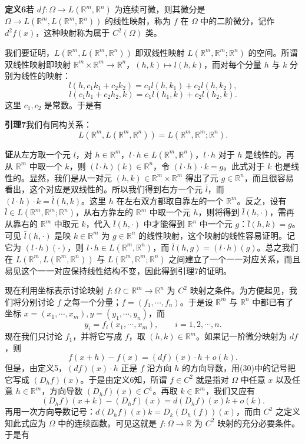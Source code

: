 \noindent\textbf{定义6}\quad 若 $df:\Omega\to L(\mathbb R^m,\mathbb R^n)$ 为连续可微，则其微分是 $\Omega\to L(\mathbb R^m,L(\mathbb R^m,\mathbb R^n))$ 的线性映射，称为 $f$ 在 $\Omega$ 中的二阶微分，记作 $d^2f(x)$，这种映射称为属于 $C^2(\Omega)$ 类。

我们要证明，$L(\mathbb R^m,L(\mathbb R^m,\mathbb R^n))$ 即双线性映射 $L(\mathbb R^m,\mathbb R^m;\mathbb R^n)$ 的空间。所谓双线性映射即映射 $\mathbb R^m\times\mathbb R^m\to\mathbb R^n$，$(h,k)\mapsto l(h,k)$，而对每个分量 $h$ 与 $k$ 分别为线性的映射：
\[
 l(h,c_1k_1+c_2k_2)=c_1l(h,k_1)+c_2l(h,k_2),
\]
\[
 l(c_1h_1+c_2h_2,k)=c_1l(h_1,k)+c_2l(h_2,k).
\]
这里 $c_1,c_2$ 是常数。于是有

\noindent\textbf{引理7}\quad 我们有同构关系：
\[
 L(\mathbb R^m,L(\mathbb R^m,\mathbb R^n))=L(\mathbb R^m,\mathbb R^m;\mathbb R^n).
\]

\noindent\textbf{证}\quad 从左方取一个元 $l$，对 $h\in\mathbb R^m$，$l\cdot h\in L(\mathbb R^m,\mathbb R^n)$，$l\cdot h$ 对于 $h$ 是线性的。再从 $\mathbb R^m$ 中取一个 $k$，则 $(l\cdot h)(k)\in\mathbb R^n$，令 $(l\cdot h)\cdot k=g$。此式对于 $k$ 也是线性的。显然，我们是从一对元 $(h,k)\in\mathbb R^m\times\mathbb R^m$ 得出了元 $g\in\mathbb R^n$，而且很容易看出，这个对应是双线性的。所以我们得到右方一个元 $\bar l$，而 $(l\cdot h)\cdot k=\bar l(h,k)$。这里 $h$ 在左右双方都取自靠左的一个 $\mathbb R^m$。反之，设有 $\bar l\in L(\mathbb R^m,\mathbb R^m;\mathbb R^n)$，从右方靠左的 $\mathbb R^m$ 中取一个元 $h$，则将得到 $\bar l(h,\cdot)$，需再从靠右的 $\mathbb R^m$ 中取元 $k$，代入 $\bar l(h,\cdot)$ 中才能得到 $\mathbb R^n$ 中一个元 $g$：$\bar l(h,k)=g$。可见 $\bar l(h,\cdot)$ 是映 $k\in\mathbb R^m$ 为 $g\in\mathbb R^n$ 的线性映射，这个映射的线性容易证明。记它为 $(l\cdot h)(\cdot)$，则 $l\cdot h\in L(\mathbb R^m,\mathbb R^n)$，而 $\bar l(h,g)=(l\cdot h)(g)$。总之我们在 $L(\mathbb R^m,L(\mathbb R^m,\mathbb R^n))$ 与 $L(\mathbb R^m,\mathbb R^m;\mathbb R^n)$ 之间建立了一个一一对应关系，而且易见这个一一对应保持线性结构不变，因此得到引理7的证明。

现在利用坐标表示讨论映射 $f:\Omega\subset\mathbb R^m\to\mathbb R^n$ 为 $C^2$ 映射之条件。为方便起见，我们将分别讨论 $f$ 之每一个分量；$f=(f_1,\cdots,f_n)$。于是设 $\mathbb R^m$ 与 $\mathbb R^n$ 中都已有了坐标 $x=(x_1,\cdots,x_m),y=(y_1,\cdots,y_n)$，而
\[
 y_i=f_i(x_1,\cdots,x_m),\qquad i=1,2,\cdots,n.
\]
现在我们只讨论 $f_1$，并将它写成 $f$，取 $(h,k)\in\mathbb R^m$。如果记一阶微分映射为 $df$，则
\[
 f(x+h)-f(x)=(df)(x)\cdot h+o(h).
\]
但是，由定义5，$(df)(x)\cdot h$ 正是 $f$ 沿方向 $h$ 的方向导数，用(30)中的记号把它写成 $(D_hf)(x)$。于是由定义6知，所谓 $f\in C^2$ 就是指对 $\Omega$ 中任意 $x$ 以及任意 $h\in\mathbb R^m$，方向导数 $(D_hf)(x)\in C^1$。再取 $k\in\mathbb R^m$，我们又应有
\[
 (D_hf)(x+k)-(D_hf)(x)=d(D_hf)(x)k+o(k).
\]
再用一次方向导数记号：$d(D_hf)(x)k=D_k(D_h(f))(x)$，而由 $C^2$ 之定义知此式应为 $\Omega$ 中的连续函数。可见这就是 $f:\Omega\to\mathbb R$ 为 $C^2$ 映射的充分必要条件。于是有

